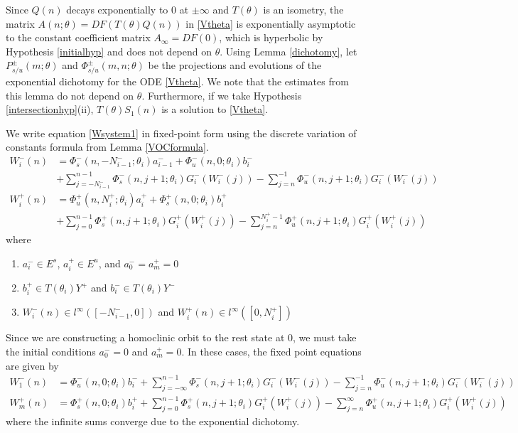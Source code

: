 \documentclass[12pt]{article}
\begin{document}
Since $Q(n)$ decays exponentially to 0 at $\pm \infty$ and $T(\theta)$ is an isometry, the matrix $A(n; \theta) = DF(T(\theta) Q(n))$ in \eqref{Vtheta} is exponentially asymptotic to the constant coefficient matrix $A_\infty = DF(0)$, which is hyperbolic by Hypothesis \ref{initialhyp} and does not depend on $\theta$. Using Lemma \ref{dichotomy}, let $P_{s/u}^\pm(m; \theta)$ and $\Phi_{s/u}^\pm(m, n; \theta)$ be the projections and evolutions of the exponential dichotomy for the ODE \ref{Vtheta}. We note that the estimates from this lemma do not depend on $\theta$. Furthermore, if we take Hypothesis \ref{intersectionhyp}(ii), $T(\theta)S_1(n)$ is a solution to \eqref{Vtheta}.

We write equation \eqref{Wsystem1} in fixed-point form using the discrete variation of constants formula from Lemma \ref{VOCformula}.
\begin{equation}\label{FPeqs1}
\begin{aligned}
W_i^-(n) &= 
\Phi_s^-(n, -N_{i-1}^-; \theta_i) a_{i-1}^- + \Phi_u^-(n, 0; \theta_i) b_i^-  \\
&+ \sum_{j = -N_{i-1}^-}^{n-1} \Phi_s^-(n, j+1; \theta_i) G_i^-(W_i^-(j)) - \sum_{j = n}^{-1} \Phi_u^-(n, j+1; \theta_i) G_i^-(W_i^-(j)) \\
W_i^+(n) &= \Phi_u^+(n, N_i^+; \theta_i) a_i^+ + \Phi_s^+(n, 0; \theta_i) b_i^+ \\
&+ \sum_{j = 0}^{n-1} \Phi_s^+(n, j+1; \theta_i) G_i^+(W_i^+(j)) 
- \sum_{j = n}^{N_i^+-1} \Phi_u^+(n, j+1; \theta_i) G_i^+(W_i^+(j))
\end{aligned}
\end{equation}
where 
\begin{enumerate}
\item $a_i^- \in E^s$, $a_i^+ \in E^u$, and $a_0^- = a_m^+ = 0$
\item $b_i^+ \in T(\theta_i) Y^+$ and $b_i^- \in T(\theta_i) Y^-$
\item $W_i^-(n) \in l^\infty([-N_{i-1}^-, 0])$ and $W_i^+(n) \in l^\infty([0, N_i^+])$
\end{enumerate}

Since we are constructing a homoclinic orbit to the rest state at 0, we must take the initial conditions $a_0^- = 0$ and $a_m^+ = 0$. In these cases, the fixed point equations are given by
\begin{align*}
W_1^-(n) &= \Phi_u^-(n, 0; \theta_i) b_i^- 
+ \sum_{j = -\infty}^{n-1} \Phi_s^-(n, j+1; \theta_i) G_i^-(W_i^-(j)) - \sum_{j = n}^{-1} \Phi_u^-(n, j+1; \theta_i) G_i^-(W_i^-(j)) \\
W_m^+(n) &= \Phi_s^+(n, 0; \theta_i) b_i^+ 
+ \sum_{j = 0}^{n-1} \Phi_s^+(n, j+1; \theta_i) G_i^+(W_i^+(j)) 
- \sum_{j = n}^\infty \Phi_u^+(n, j+1; \theta_i) G_i^+(W_i^+(j))
\end{align*}
where the infinite sums converge due to the exponential dichotomy. 
\end{document}
